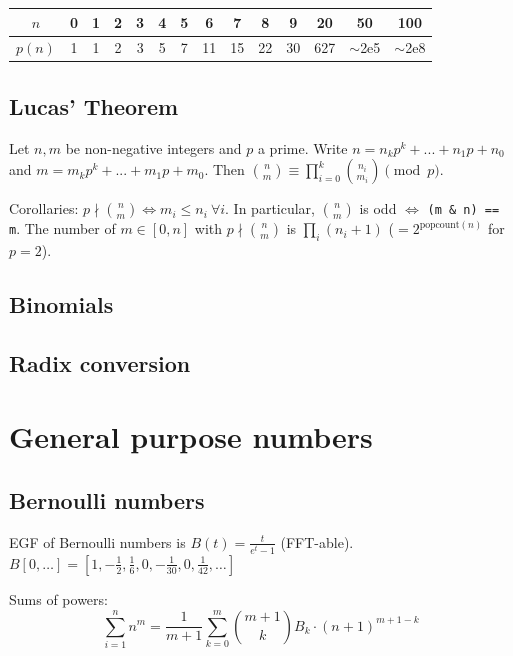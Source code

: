 		\begin{center}
		\begin{tabular}{c|c@{\ }c@{\ }c@{\ }c@{\ }c@{\ }c@{\ }c@{\ }c@{\ }c@{\ }c@{\ }c@{\ }c@{\ }c}
			$n$    & 0 & 1 & 2 & 3 & 4 & 5 & 6  & 7  & 8  & 9  & 20  & 50  & 100 \\ \hline
			$p(n)$ & 1 & 1 & 2 & 3 & 5 & 7 & 11 & 15 & 22 & 30 & 627 & $\mathtt{\sim}$2e5 & $\mathtt{\sim}$2e8 \\
		\end{tabular}
		\end{center}

	\subsection{Lucas' Theorem}
		Let $n,m$ be non-negative integers and $p$ a prime. Write $n=n_kp^k+...+n_1p+n_0$ and $m=m_kp^k+...+m_1p+m_0$. Then $\binom{n}{m} \equiv \prod_{i=0}^k\binom{n_i}{m_i} \pmod{p}$.

		Corollaries: $p \nmid \binom{n}{m} \iff m_i \le n_i\ \forall i$. In particular, $\binom{n}{m}$ is odd $\iff$ \texttt{(m \& n) == m}.
		The number of $m \in [0,n]$ with $p \nmid \binom{n}{m}$ is $\prod_i (n_i+1)$ ($= 2^{\text{popcount}(n)}$ for $p=2$).

	\subsection{Binomials}

	\subsection{Radix conversion}

\section{General purpose numbers}
	\subsection{Bernoulli numbers}
		EGF of Bernoulli numbers is $B(t)=\frac{t}{e^t-1}$ (FFT-able).
		$B[0,\ldots] = [1, -\frac{1}{2}, \frac{1}{6}, 0, -\frac{1}{30}, 0, \frac{1}{42}, \ldots]$

		Sums of powers:
		\small
		\[ \sum_{i=1}^n n^m = \frac{1}{m+1} \sum_{k=0}^m \binom{m+1}{k} B_k \cdot (n+1)^{m+1-k} \]
		\normalsize

